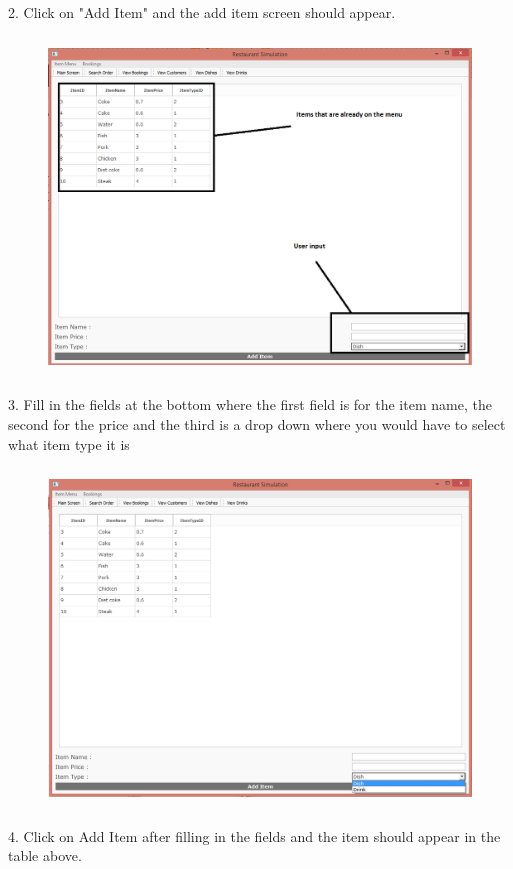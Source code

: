 2. Click on "Add Item" and the add item screen should appear.



\begin{figure}[H]
    \includegraphics[height = 9cm]{./Manual/images/AddItem2} 
    \caption{} \label{fig:additem2}
\end{figure}

3. Fill in the fields at the bottom where the first field is for the item name, the second for the price and the third is a drop down where you would have to select what item type it is

\begin{figure}[H]
    \includegraphics[height = 9cm]{./Manual/images/AddItem3} 
    \caption{} \label{fig:additem3}
\end{figure}

4. Click on Add Item after filling in the fields and the item should appear in the table above.

